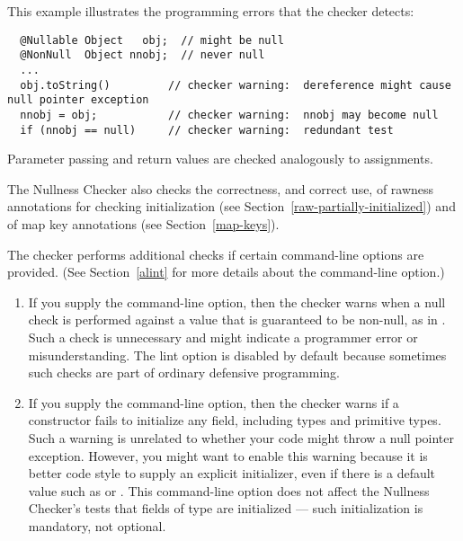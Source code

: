 This example illustrates the programming errors that the checker detects:

\begin{Verbatim}
  @Nullable Object   obj;  // might be null
  @NonNull  Object nnobj;  // never null
  ...
  obj.toString()         // checker warning:  dereference might cause null pointer exception
  nnobj = obj;           // checker warning:  nnobj may become null
  if (nnobj == null)     // checker warning:  redundant test
\end{Verbatim}

Parameter passing and return values are checked analogously to assignments.

The Nullness Checker also checks the correctness, and correct use, of
rawness annotations for checking initialization (see
Section~\ref{raw-partially-initialized}) and of map key annotations (see
Section~\ref{map-keys}).


The checker performs additional checks if certain 
command-line options are provided.  (See
Section~\ref{alint} for more details about the 
command-line option.)

\begin{enumerate}
\item
  \label{lint-nulltest}%
  If you supply the  command-line option, then the
  checker warns when a null check is performed against a value that is
  guaranteed to be non-null, as in .  Such a check is
  unnecessary and might indicate a programmer error or misunderstanding.
  The lint option is disabled by default because sometimes such checks are
  part of ordinary defensive programming.  

\item
  \label{lint-uninitialized}%
  If you supply the  command-line option, then
  the checker warns if a constructor fails to initialize any field,
  including  types and primitive
  types.  Such a warning is unrelated to whether your code might throw a
  null pointer exception.  However, you might want to enable this warning
  because it is better code style to supply an explicit initializer, even
  if there is a default value such as  or .
  This command-line option does not affect the Nullness Checker's tests
  that fields of  type are
  initialized --- such initialization is mandatory, not optional.

\end{enumerate}


